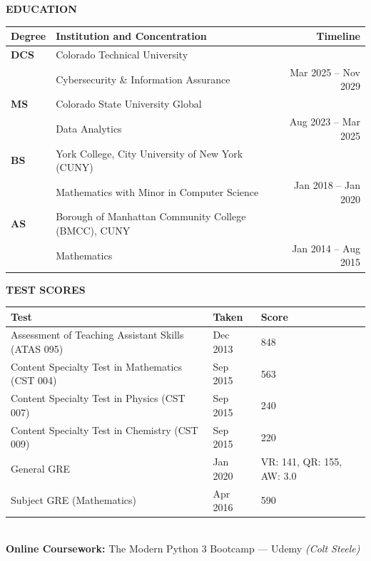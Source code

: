 \documentclass[a4paper, 12pt]{article}
\begin{document}
\begin{flushleft}
\faGraduationCap\quad\textbf{EDUCATION}\\[6pt]
\begin{tabularx}{\textwidth}{@{}lXr@{}}
\toprule
\textbf{Degree} & \textbf{Institution and Concentration} & \textbf{Timeline} \\
\midrule
\textbf{DCS} & Colorado Technical University &\\
             & Cybersecurity \& Information Assurance & Mar 2025 – Nov 2029 \\[4pt]
\textbf{MS}  & Colorado State University Global &\\
             & Data Analytics & Aug 2023 – Mar 2025 \\[4pt]
\textbf{BS}  & York College, City University of New York (CUNY) &\\
             & Mathematics with Minor in Computer Science & Jan 2018 – Jan 2020 \\[4pt]
\textbf{AS}  & Borough of Manhattan Community College (BMCC), CUNY &\\
             & Mathematics & Jan 2014 – Aug 2015 \\
\bottomrule
\end{tabularx}
\end{flushleft}

\begin{flushleft}
\faChalkboard\quad\textbf{TEST SCORES}\\[6pt]
\begin{tabularx}{\textwidth}{@{}Xll@{}}
\toprule
\textbf{Test} & \textbf{Taken} & \textbf{Score}\\
\midrule
Assessment of Teaching Assistant Skills (ATAS 095) & Dec 2013 & 848\\
Content Specialty Test in Mathematics (CST 004)    & Sep 2015 & 563\\
Content Specialty Test in Physics (CST 007)        & Sep 2015 & 240\\
Content Specialty Test in Chemistry (CST 009)      & Sep 2015 & 220\\
General GRE                                        & Jan 2020 & VR: 141, QR: 155, AW: 3.0\\
Subject GRE (Mathematics)                          & Apr 2016 & 590\\
\bottomrule
\end{tabularx}\\[6pt]
\textbf{Online Coursework:} The Modern Python 3 Bootcamp --- Udemy
  \quad\textit{(Colt Steele)}
\end{flushleft}
\end{document}
